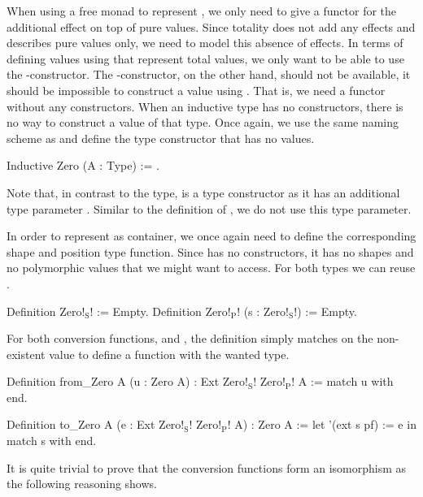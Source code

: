 When using a free monad to represent , we only need to give a functor for the additional effect on top of pure values.
Since totality does not add any effects and describes pure values only, we need to model this absence of effects.
In terms of defining values using  that represent total values, we only want to be able to use the \--constructor.
The \--constructor, on the other hand, should not be available, it should be impossible to construct a value using .
That is, we need a functor without any constructors.
When an inductive type has no constructors, there is no way to construct a value of that type.
Once again, we use the same naming scheme as \citeauthor{swierstra2008data} and define the type constructor  that has no values.

\begin{coqcode}
Inductive Zero (A : Type) := .
\end{coqcode}

Note that, in contrast to the  type,  is a type constructor as it has an additional type parameter .
Similar to the definition of , we do not use this type parameter.

In order to represent  as container, we once again need to define the corresponding shape and position type function.
Since  has no constructors, it has no shapes and no polymorphic values that we might want to access.
For both types we can reuse .

\begin{coqcode}
Definition Zero!$_\text{S}$! := Empty.
Definition Zero!$_\text{P}$! (s : Zero!$_\text{S}$!) := Empty.
\end{coqcode}

For both conversion functions,  and , the definition simply matches on the non\--existent value to define a function with the wanted type.

\begin{coqcode}
Definition from_Zero A (u : Zero A) : Ext Zero!$_\text{S}$! Zero!$_\text{P}$! A :=
  match u with end.

Definition to_Zero A (e : Ext Zero!$_\text{S}$! Zero!$_\text{P}$! A) : Zero A :=
  let '(ext s pf) := e in match s with end.
\end{coqcode}

It is quite trivial to prove that the conversion functions form an isomorphism as the following reasoning shows.

